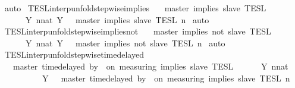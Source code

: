 \begin{isabellebody}
%
\isadelimproof
%
\endisadelimproof
%
\isatagproof
{}\isamarkupfalse%
\ auto%
\endisatagproof
{\isafoldproof}%
%
\isadelimproof
\isanewline
%
\endisadelimproof
\isanewline
{}\isamarkupfalse%
\ TESL{\isacharunderscore}interp{\isacharunderscore}unfold{\isacharunderscore}stepwise{\isacharunderscore}implies{\isacharcolon}\isanewline
\ \ {\isacartoucheopen}{\isasymlbrakk}\ master\ implies\ slave\ {\isasymrbrakk}\isactrlsub T\isactrlsub E\isactrlsub S\isactrlsub L\isanewline
\ \ \ \ {\isacharequal}\ {\isasymInter}\ {\isacharbraceleft}Y{\isachardot}\ {\isasymexists}n{\isacharcolon}{\isacharcolon}nat{\isachardot}\ Y\ {\isacharequal}\ {\isasymlbrakk}\ master\ implies\ slave\ {\isasymrbrakk}\isactrlsub T\isactrlsub E\isactrlsub S\isactrlsub L\isactrlbsup {\isasymge}\ n\isactrlesup {\isacharbraceright}{\isacartoucheclose}\isanewline
%
\isadelimproof
%
\endisadelimproof
%
\isatagproof
{}\isamarkupfalse%
\ auto%
\endisatagproof
{\isafoldproof}%
%
\isadelimproof
\isanewline
%
\endisadelimproof
\isanewline
{}\isamarkupfalse%
\ TESL{\isacharunderscore}interp{\isacharunderscore}unfold{\isacharunderscore}stepwise{\isacharunderscore}implies{\isacharunderscore}not{\isacharcolon}\isanewline
\ \ {\isacartoucheopen}{\isasymlbrakk}\ master\ implies\ not\ slave\ {\isasymrbrakk}\isactrlsub T\isactrlsub E\isactrlsub S\isactrlsub L\isanewline
\ \ \ \ {\isacharequal}\ {\isasymInter}\ {\isacharbraceleft}Y{\isachardot}\ {\isasymexists}n{\isacharcolon}{\isacharcolon}nat{\isachardot}\ Y\ {\isacharequal}\ {\isasymlbrakk}\ master\ implies\ not\ slave\ {\isasymrbrakk}\isactrlsub T\isactrlsub E\isactrlsub S\isactrlsub L\isactrlbsup {\isasymge}\ n\isactrlesup {\isacharbraceright}{\isacartoucheclose}\isanewline
%
\isadelimproof
%
\endisadelimproof
%
\isatagproof
{}\isamarkupfalse%
\ auto%
\endisatagproof
{\isafoldproof}%
%
\isadelimproof
\isanewline
%
\endisadelimproof
\isanewline
{}\isamarkupfalse%
\ TESL{\isacharunderscore}interp{\isacharunderscore}unfold{\isacharunderscore}stepwise{\isacharunderscore}timedelayed{\isacharcolon}\isanewline
\ \ {\isacartoucheopen}{\isasymlbrakk}\ master\ time{\isacharminus}delayed\ by\ {\isasymdelta}{\isasymtau}\ on\ measuring\ implies\ slave\ {\isasymrbrakk}\isactrlsub T\isactrlsub E\isactrlsub S\isactrlsub L\isanewline
\ \ \ \ {\isacharequal}\ {\isasymInter}\ {\isacharbraceleft}Y{\isachardot}\ {\isasymexists}n{\isacharcolon}{\isacharcolon}nat{\isachardot}\isanewline
\ \ \ \ \ \ \ \ \ \ Y\ {\isacharequal}\ {\isasymlbrakk}\ master\ time{\isacharminus}delayed\ by\ {\isasymdelta}{\isasymtau}\ on\ measuring\ implies\ slave\ {\isasymrbrakk}\isactrlsub T\isactrlsub E\isactrlsub S\isactrlsub L\isactrlbsup {\isasymge}\ n\isactrlesup {\isacharbraceright}{\isacartoucheclose}\isanewline

\end{isabellebody}
